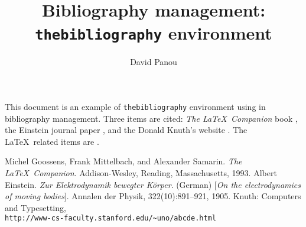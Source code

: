 \documentclass[a4paper,10pt]{article}
\title{Bibliography management:\\\texttt{thebibliography} environment}
\author{David Panou}
\begin{document}
\maketitle

This document is an example of \texttt{thebibliography} environment using in bibliography management. Three items are cited: \textit{The \LaTeX\ Companion} book \cite{latexcompanion}, the Einstein journal paper \cite{einstein}, and the Donald Knuth's website \cite{knuthwebsite}. The \LaTeX\ related items are \cite{latexcompanion,knuthwebsite}. 

\medskip

\begin{thebibliography}{9}
 Michel Goossens, Frank Mittelbach, and Alexander Samarin. \textit{The \LaTeX\ Companion}. Addison-Wesley, Reading, Massachusetts, 1993.
 Albert Einstein. \textit{Zur Elektrodynamik bewegter K{\"o}rper}. (German) [\textit{On the electrodynamics of moving bodies}]. Annalen der Physik, 322(10):891–921, 1905.
 Knuth: Computers and Typesetting,\\\texttt{http://www-cs-faculty.stanford.edu/\~{}uno/abcde.html}
\end{thebibliography}
\end{document}
